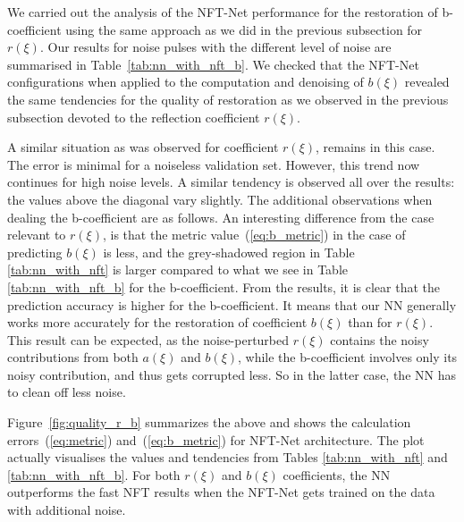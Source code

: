 We carried out the analysis of the NFT-Net performance for the restoration of b-coefficient using the same approach as we did in the previous subsection for $r(\xi)$. Our results for noise pulses with the different level of noise are summarised in Table~\ref{tab:nn_with_nft_b}. 
We checked that the NFT-Net configurations when applied to the computation and denoising of $b(\xi)$ revealed the same tendencies for the quality of restoration as we observed in the previous subsection devoted to the reflection coefficient $r(\xi)$.

A similar situation as was observed for coefficient $r(\xi)$, remains in this case. The error is minimal for a noiseless validation set. However, this trend now continues for high noise levels.
A similar tendency is observed all over the results: the values above the diagonal vary slightly.
The additional observations when dealing the b-coefficient are as follows. An interesting difference from the case relevant to $r(\xi)$, is that the metric value~(\ref{eq:b_metric}) in the case of predicting $b(\xi)$ is less, and the grey-shadowed region in Table \ref{tab:nn_with_nft} is larger compared to what we see in Table \ref{tab:nn_with_nft_b} for the b-coefficient.
From the results, it is clear that the prediction accuracy is higher for the b-coefficient. 
It means that our NN generally works more accurately for the restoration of coefficient $b(\xi)$ than for $r(\xi)$. This result can be expected, as the noise-perturbed $r(\xi)$ contains the noisy contributions from both $a(\xi)$ and $b(\xi)$, while the b-coefficient involves only its noisy contribution, and thus gets corrupted less. So in the latter case, the NN has to clean off less noise.

Figure~\ref{fig:quality_r_b} summarizes the above and shows the calculation errors~(\ref{eq:metric}) and~(\ref{eq:b_metric})  for NFT-Net architecture. The plot actually visualises the values and tendencies from Tables \ref{tab:nn_with_nft} and \ref{tab:nn_with_nft_b}. For both $r(\xi)$ and $b(\xi)$ coefficients, the NN outperforms the fast NFT results when the NFT-Net gets trained on the data with additional noise. 


